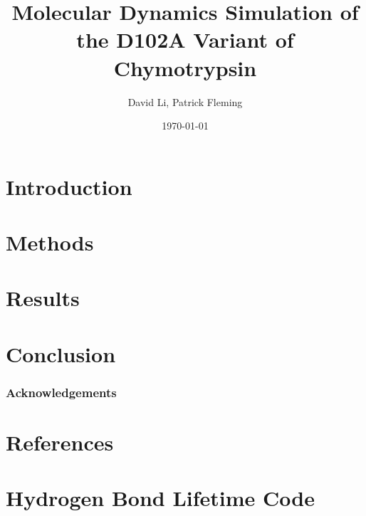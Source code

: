 \documentclass[11pt, twocolumn]{article}
\begin{document}
\title{Molecular Dynamics Simulation of the D102A Variant of Chymotrypsin}
\author{David Li, Patrick Fleming}
\date{\today}
\maketitle

\section{Introduction}

\lipsum[1]


\section{Methods}

\lipsum[1]

\section{Results}

\lipsum[1]
\lipsum[2]

\section{Conclusion}

\lipsum[1]

\subsubsection*{Acknowledgements}

\section{References}


\appendix

\section{Hydrogen Bond Lifetime Code}
\end{document}

